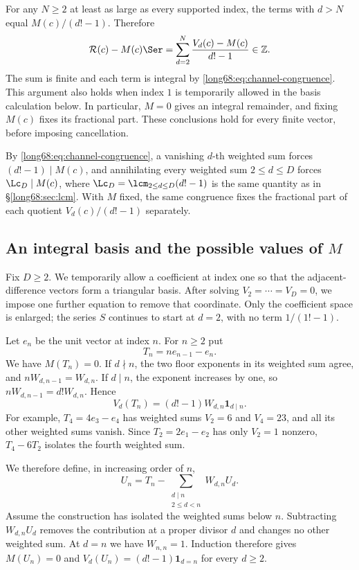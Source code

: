 For any $N\ge2$ at least as large as every supported index, the terms
with $d>N$ equal $M(c)/(d!-1)$. Therefore
\[
 \mathcal R(c)-M(c)\Ser
 =\sum_{d=2}^N\frac{V_d(c)-M(c)}{d!-1}\in\mathbb Z.
\]
The sum is finite and each term is integral by
\eqref{long68:eq:channel-congruence}. This argument also holds when
index $1$ is temporarily allowed in the basis calculation below.
In particular, $M=0$ gives an integral remainder, and fixing
$M(c)$ fixes its fractional part. These conclusions hold for every
finite vector, before imposing cancellation.

By \eqref{long68:eq:channel-congruence}, a vanishing $d$-th weighted sum forces $(d!-1)\mid M(c)$,
and annihilating every weighted sum $2\le d\le D$ forces $\Lc_D\mid M(c)$, where
$\Lc_D=\lcm_{2\le d\le D}(d!-1)$ is the same quantity as in
\S\ref{long68:sec:lcm}. With $M$ fixed, the same congruence fixes the
fractional part of each quotient $V_d(c)/(d!-1)$ separately.

\subsection{An integral basis and the possible values of \texorpdfstring{$M$}{M}}\label{long68:sec:basis}

Fix $D\ge2$. We temporarily allow a coefficient at index one so that
the adjacent-difference vectors form a triangular basis. After solving
$V_2=\cdots=V_D=0$, we impose one further equation to remove that
coordinate. Only the coefficient space is enlarged; the series $S$
continues to start at $d=2$, with no term $1/(1!-1)$.

Let $e_n$ be the unit vector at index $n$. For $n\ge2$ put
\[
 T_n=ne_{n-1}-e_n.
\]
We have $M(T_n)=0$. If $d\nmid n$, the two floor exponents in its weighted
sum agree, and $nW_{d,n-1}=W_{d,n}$. If $d\mid n$, the exponent increases
by one, so $nW_{d,n-1}=d!W_{d,n}$. Hence
\[
 V_d(T_n)=(d!-1)W_{d,n}\mathbf1_{d\mid n}.
\]
For example, $T_4=4e_3-e_4$ has weighted sums $V_2=6$ and $V_4=23$,
and all its other weighted sums vanish. Since $T_2=2e_1-e_2$ has only
$V_2=1$ nonzero, $T_4-6T_2$ isolates the fourth weighted sum.

We therefore define, in increasing order of $n$,
\[
 U_n=T_n-\sum_{\substack{d\mid n\\2\le d<n}}W_{d,n}U_d.
\]
Assume the construction has isolated the weighted sums below $n$.
Subtracting $W_{d,n}U_d$ removes the contribution at a proper divisor
$d$ and changes no other weighted sum. At $d=n$ we have $W_{n,n}=1$.
Induction therefore gives $M(U_n)=0$ and
$V_d(U_n)=(d!-1)\mathbf1_{d=n}$ for every $d\ge2$.

